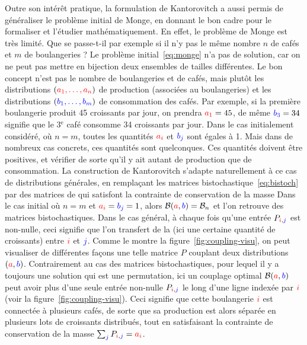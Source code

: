 Outre son intérêt pratique, la formulation de Kantorovitch a aussi permis de généraliser le problème initial de Monge, en donnant le bon cadre pour le formaliser et l'étudier mathématiquement. En effet, le problème de Monge est très limité. Que se passe-t-il par exemple si il n'y pas le même nombre $n$ de cafés et $m$ de boulangeries ? Le problème initial~\eqref{eq:monge} n'a pas de solution, car on ne peut pas mettre en bijection deux ensembles de tailles différentes. Le bon concept n'est pas le nombre de boulangeries et de cafés, mais plutôt les distributions $({\color{red}a_1,\ldots,a_n})$ de production (associées au boulangeries) et les distributions $({\color{blue}b_1,\ldots,b_m})$ de consommation des cafés. 
%
Par exemple, si la première boulangerie produit 45 croissants par jour, on prendra ${\color{red}a_1} =45$, de même ${\color{blue}b_3} = 34$ signifie que le 3$^\text{e}$ café consomme 34 croissants par jour.
%
Dans le cas initialement considéré, où $n=m$, toutes les quantités ${\color{red}a_i}$ et ${\color{blue}b_j}$ sont égales à 1. Mais dans de nombreux cas concrets, ces quantités sont quelconques. Ces quantités doivent être positives, et vérifier 
de sorte qu'il y ait autant de production que de consommation. La construction de Kantorovitch s'adapte naturellement à ce cas de distributions générales, en remplaçant les matrices bistochastique~\eqref{eq:bistoch} par des matrices de  qui satisfont la contrainte de conservation de la masse 
Dans le cas initial où $n=m$ et ${\color{red}a_i}={\color{blue}b_j}=1$, alors $\mathcal{B}({\color{red}a},{\color{blue}b}) = \mathcal{B}_n$ et l'on retrouve des matrices bistochastiques. Dans le cas général, à chaque fois qu'une entrée $P_{{\color{red}i},{\color{blue}j}}$ est non-nulle, ceci signifie que l'on transfert de la  (ici une certaine quantité de croissants) entre ${\color{red}i}$ et ${\color{blue}j}$. Comme le montre la figure~\ref{fig:coupling-visu}, on peut visualiser de différentes façons une telle matrice $P$ couplant deux distributions $({\color{red}a},{\color{blue}b})$.
%
Contrairement au cas des matrices bistochastiques, pour lequel il y a toujours une solution qui est une permutation, ici un couplage optimal $\mathcal{B}({\color{red}a},{\color{blue}b})$ peut avoir plus d'une seule entrée non-nulle $P_{{\color{red}i},{\color{blue}j}}$ le long d'une ligne indexée par ${\color{red}i}$ (voir la figure~\ref{fig:coupling-visu}). Ceci signifie que cette boulangerie ${\color{red}i}$ est connectée à plusieurs cafés, de sorte que sa production est alors séparée en plusieurs lots de croissants distribués, tout en satisfaisant la contrainte de conservation de la masse $\sum_{{\color{blue}j}} P_{{\color{red}i},{\color{blue}j}}={\color{red}a_i}$.


